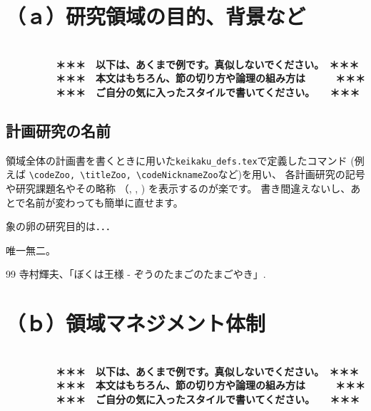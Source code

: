 \documentclass[11pt,a4j,dvipdfmx]{jarticle} 					%
\newcommand{\研究課題名}{象の卵}
\newcommand{\研究機関名}{逢坂大学}
\newcommand{\研究代表者氏名}{湯川秀樹}
\newcommand{\研究期間の最終元号年度}{8}  %
\begin{document}

\section{（ａ）研究領域の目的、背景など}

\JSPSInstructions		%
\textbf{\\　　　　　＊＊＊　以下は、あくまで例です。真似しないでください。　＊＊＊\\
　　　　　＊＊＊　本文はもちろん、節の切り方や論理の組み方は　　　＊＊＊\\
　　　　　＊＊＊　ご自分の気に入ったスタイルで書いてください。　　＊＊＊}

\subsection{計画研究の名前}
        領域全体の計画書を書くときに用いた\texttt{keikaku\_defs.tex}で定義したコマンド
        (例えば
        \texttt{\textbackslash codeZoo, \textbackslash titleZoo, \textbackslash codeNicknameZoo}など)を用い、
        各計画研究の記号や研究課題名やその略称
        （\codeZoo, \titleZoo, \codeNicknameZoo)
        を表示するのが楽です。
       書き間違えないし、あとで名前が変わっても簡単に直せます。

	 象の卵の研究目的は．．．

	唯一無二。




	\vspace{1cm}
	\begin{thebibliography}{99}
		 寺村輝夫、「ぼくは王様 - ぞうのたまごのたまごやき」.
	\end{thebibliography}




\section{（ｂ）領域マネジメント体制}

\textbf{\\　　　　　＊＊＊　以下は、あくまで例です。真似しないでください。　＊＊＊\\
　　　　　＊＊＊　本文はもちろん、節の切り方や論理の組み方は　　　＊＊＊\\
　　　　　＊＊＊　ご自分の気に入ったスタイルで書いてください。　　＊＊＊}
\end{document}
